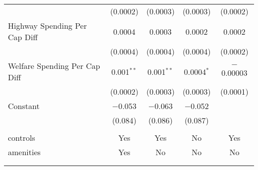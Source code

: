 \begin{table}[!htbp]
\begin{tabular}{@{\extracolsep{5pt}}lcccc}
  & (0.0002) & (0.0003) & (0.0003) & (0.0002) \\ 
  Highway Spending Per Cap Diff & 0.0004 & 0.0003 & 0.0002 & 0.0002 \\ 
  & (0.0004) & (0.0004) & (0.0004) & (0.0002) \\ 
  Welfare Spending Per Cap Diff & 0.001$^{**}$ & 0.001$^{**}$ & 0.0004$^{*}$ & $-$0.00003 \\ 
  & (0.0002) & (0.0003) & (0.0003) & (0.0001) \\ 
  Constant & $-$0.053 & $-$0.063 & $-$0.052 &  \\ 
  & (0.084) & (0.086) & (0.087) &  \\ 
 \hline \\[-1.8ex] 
controls & Yes & Yes & No & Yes \\ 
amenities & Yes & No & No & No \\ 
\hline \\[-1.8ex] 
\hline 
\hline \\[-1.8ex] 
\end{tabular} 
\end{table} 
